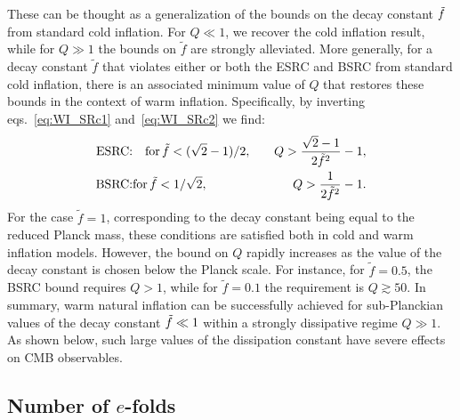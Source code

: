 \documentclass[a4paper,11pt]{article}
\begin{document}
These can be thought as a generalization of the bounds on the decay constant $\Tilde{f}$ from standard cold inflation. For $Q \ll 1$, we recover the cold inflation result, while for $Q\gg 1$ the bounds on $\tilde{f}$ are strongly alleviated. More generally, for a decay constant $\tilde{f}$ that violates either or both the ESRC and BSRC from standard cold inflation, there is an associated minimum value of $Q$ that restores these bounds in the context of warm inflation. Specifically, by inverting eqs.~\eqref{eq:WI_SRc1} and~\eqref{eq:WI_SRc2} we find:
\begin{eqnarray}
    \text{ESRC:}& \quad \text{for\,} \tilde{f} <(\sqrt{2}-1)/2,\quad &Q>\frac{\sqrt{2}-1}{2\tilde{f}^2}-1, \label{eq:WI_SRc3} \\
    \text{BSRC:}& \text{for\,} \tilde{f} <1/\sqrt{2}, \quad &Q>\frac{1}{2\tilde{f}^2}-1. \label{eq:WI_SRc4}
\end{eqnarray}
For the case $\tilde{f}= 1$, corresponding to the decay constant being equal to the reduced Planck mass, these conditions are satisfied both in cold and warm inflation models. However, the bound on $Q$ rapidly increases as the value of the decay constant is chosen below the Planck scale. For instance, for $\tilde{f}=0.5$, the BSRC bound requires $Q>1$, while for $\tilde{f}=0.1$ the requirement is $Q\gtrsim 50$. In summary, warm natural inflation can be successfully achieved for sub-Planckian values of the decay constant $\Tilde{f}\ll 1$ within a strongly dissipative regime $Q \gg 1$. As shown below, such large values of the dissipation constant have severe effects on CMB observables.

\subsection{Number of $e$-folds}
\end{document}
